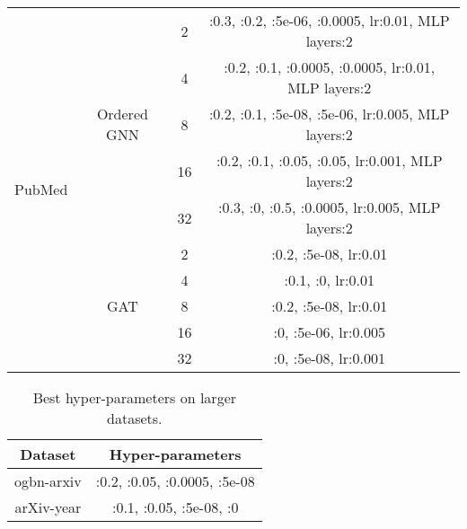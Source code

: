 \documentclass{article}
\begin{document}
\begin{table}
{\begin{tabular}{cc|c|c}
\multirow{10}{*}{PubMed} & \multirow{5}{*}{Ordered GNN} & 2 & :0.3, :0.2, :5e-06, :0.0005, lr:0.01, MLP layers:2\\
\cline{3-4}
&& 4 & :0.2, :0.1, :0.0005, :0.0005, lr:0.01, MLP layers:2\\
\cline{3-4}
&& 8 & :0.2, :0.1, :5e-08, :5e-06, lr:0.005, MLP layers:2\\
\cline{3-4}
&& 16 & :0.2, :0.1, :0.05, :0.05, lr:0.001, MLP layers:2\\
\cline{3-4}
&& 32 & :0.3, :0, :0.5, :0.0005, lr:0.005, MLP layers:2\\
\cline{2-4}


& \multirow{5}{*}{GAT} & 2 & :0.2, :5e-08, lr:0.01\\
\cline{3-4}
&& 4 & :0.1, :0, lr:0.01\\
\cline{3-4}
&& 8 & :0.2, :5e-08, lr:0.01\\
\cline{3-4}
&& 16 & :0, :5e-06, lr:0.005\\
\cline{3-4}
&& 32 & :0, :5e-08, lr:0.001\\
\bottomrule

\end{tabular}
}
\end{table}



\begin{table}
\caption{Best hyper-parameters on larger datasets.}
\label{table.hyper.larger}
\centering
\begin{tabular}{c|c}

\toprule
Dataset & Hyper-parameters\\
\midrule
ogbn-arxiv & :0.2, :0.05, :0.0005, :5e-08\\
\midrule
arXiv-year & :0.1, :0.05, :5e-08, :0\\
\bottomrule

\end{tabular}
\end{table}
\end{document}
